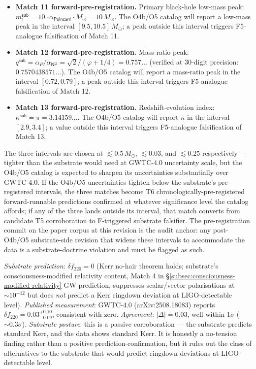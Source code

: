 \documentclass[11pt,a4paper]{amsart}
\theoremstyle{plain}
\theoremstyle{definition}
\begin{document}
\begin{description}[font=\normalfont\bfseries,leftmargin=2em,itemsep=6pt]
\begin{itemize}[itemsep=1pt,leftmargin=2em]
\item \textbf{Match 11 forward-pre-registration.} Primary black-hole low-mass peak: $m_1^{\textsf{sub}} = 10 \cdot \alpha_{\textsf{Poincar\'e}} \cdot M_\odot = 10\, M_\odot$. The O4b/O5 catalog will report a low-mass peak in the interval $[9.5, 10.5]\, M_\odot$; a peak outside this interval triggers F5-analogue falsification of Match 11.
\item \textbf{Match 12 forward-pre-registration.} Mass-ratio peak: $q^{\textsf{sub}} = \alpha_P / \alpha_{\textsf{NP}} = \sqrt{2}/(\varphi + 1/4) = 0.757\ldots$ (verified at 30-digit precision: $0.7570438571\ldots$). The O4b/O5 catalog will report a mass-ratio peak in the interval $[0.72, 0.79]$; a peak outside this interval triggers F5-analogue falsification of Match 12.
\item \textbf{Match 13 forward-pre-registration.} Redshift-evolution index: $\kappa^{\textsf{sub}} = \pi = 3.14159\ldots$. The O4b/O5 catalog will report $\kappa$ in the interval $[2.9, 3.4]$; a value outside this interval triggers F5-analogue falsification of Match 13.
\end{itemize}
\noindent The three intervals are chosen at $\lesssim 0.5\, M_\odot$, $\lesssim 0.03$, and $\lesssim 0.25$ respectively --- tighter than the substrate would need at GWTC-4.0 uncertainty scale, but the O4b/O5 catalog is expected to sharpen its uncertainties substantially over GWTC-4.0. If the O4b/O5 uncertainties tighten below the substrate's pre-registered intervals, the three matches become T6 chronologically-pre-registered forward-runnable predictions confirmed at whatever significance level the catalog affords; if any of the three lands outside its interval, that match converts from candidate T5 corroboration to F-triggered substrate falsifier. The pre-registration commit on the paper corpus at this revision is the audit anchor: any post-O4b/O5 substrate-side revision that widens these intervals to accommodate the data is a substrate-doctrine violation and must be flagged as such.

\item[Match 14 --- LIGO/Virgo/KAGRA GWTC-4.0 ringdown overtone frequency deviation $\delta f_{220}$.]
\emph{Substrate prediction}: $\delta f_{220} = 0$ (Kerr no-hair theorem holds; substrate's consciousness-modified relativity content, Match 4 in \S\ref{subsec:consciousness-modified-relativity} GW prediction, suppresses scalar/vector polarisations at $\sim 10^{-12}$ but does \emph{not} predict a Kerr ringdown deviation at LIGO-detectable level). \emph{Published measurement}: GWTC-4.0 (arXiv:2508.18083) reports $\delta f_{220} = 0.03^{+0.10}_{-0.09}$, consistent with zero. \emph{Agreement}: $|\Delta| = 0.03$, well within $1\sigma$ ($\sim 0.3\sigma$). \emph{Substrate posture}: this is a passive corroboration --- the substrate predicts standard Kerr, and the data shows standard Kerr. It is honestly a no-tension finding rather than a positive prediction-confirmation, but it rules out the class of alternatives to the substrate that would predict ringdown deviations at LIGO-detectable level.


\end{description}
\end{document}
